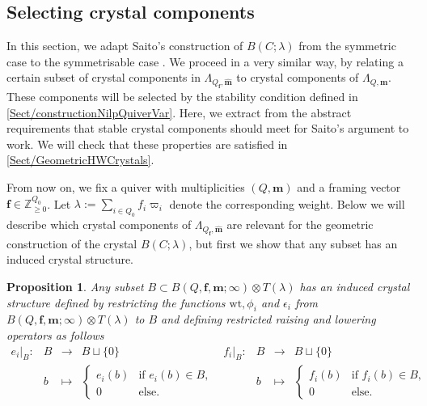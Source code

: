 \documentclass[a4paper,12pt]{article}
\theoremstyle{definition}
\theoremstyle{plain}
\newtheorem{proposition}[definition]{Proposition}
\theoremstyle{remark}
\newcommand\bbZ{\mathbb{Z}}
\newcommand\bff{\mathbf{f}}
\newcommand\bfm{\mathbf{m}}
\begin{document}
\subsection{Selecting crystal components}\label{Sect/selectCrystalComponents}

In this section, we adapt Saito's construction of $B(C;\lambda)$ from the symmetric case to the symmetrisable case \cite{Sai02}. We proceed in a very similar way, by relating a certain subset of crystal components in $\Lambda_{Q_\bff,\widehat{\bfm}}$ to crystal components of $\Lambda_{Q,\bfm}$. These components will be selected by the stability condition defined in \cref{Sect/constructionNilpQuiverVar}. Here, we extract from \cite{Sai02} the abstract requirements that stable crystal components should meet for Saito's argument to work. We will check that these properties are satisfied in \cref{Sect/GeometricHWCrystals}.

From now on, we fix a quiver with multiplicities $(Q,\bfm)$ and a framing vector $\bff\in\bbZ_{\geq0}^{Q_0}$. Let $\lambda:=\sum_{i\in Q_0}f_i\varpi_i$ denote the corresponding weight. Below we will describe which crystal components of $\Lambda_{Q_\bff,\widehat{\bfm}}$ are relevant for the geometric construction of the crystal $B(C;\lambda)$, but first we show that any subset has an induced crystal structure.

\begin{proposition}\label{Prop/crystalRestriction}
Any subset $B\subset B(Q,\bff,\bfm;\infty)\otimes T(\lambda)$ has an induced crystal structure defined by restricting the functions $\mathrm{wt},\phi_i$ and $\epsilon_i$ from $B(Q,\bff,\bfm;\infty)\otimes T(\lambda)$ to $B$ and defining restricted raising and lowering operators as follows
\[
\begin{array}{rrcl}
e_i\vert_B\colon  & B & \rightarrow & B\sqcup\{0\} \\
& b & \mapsto & 
\left\{
\begin{array}{ll}
e_i(b) & \text{if } e_i(b)\in B, \\
0 & \text{else.}
\end{array}
\right.
\end{array}
\begin{array}{rrcl}
f_i\vert_B \colon & B & \rightarrow & B\sqcup\{0\} \\
& b & \mapsto &
\left\{
\begin{array}{ll}
f_i(b) & \text{if } f_i(b)\in B, \\
0 & \text{else.}
\end{array}
\right.
\end{array}
\]

\end{proposition}
\end{document}
